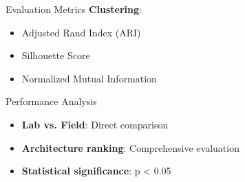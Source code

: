 \documentclass[aspectratio=43]{beamer}
\begin{document}
\begin{frame}
\begin{columns}
\begin{column}{0.5\textwidth}
\begin{block}{Evaluation Metrics}
                \vspace{0.3cm}
                \textbf{Clustering}:
                \begin{itemize}
                    \item Adjusted Rand Index (ARI)
                    \item Silhouette Score
                    \item Normalized Mutual Information
                \end{itemize}
            \end{block}
            
            \begin{alertblock}{Performance Analysis}
                \begin{itemize}
                    \item \textbf{Lab vs. Field}: Direct comparison
                    \item \textbf{Architecture ranking}: Comprehensive evaluation
                    \item \textbf{Statistical significance}: p < 0.05
                \end{itemize}
            \end{alertblock}
        \end{column}
    \end{columns}
\end{frame}
\end{document}
